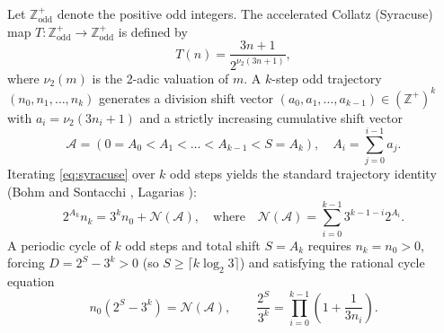 \documentclass[11pt, a4paper]{amsart}
\theoremstyle{definition}
\newcommand{\Z}{\mathbb{Z}}
\newcommand{\N}{\mathcal{N}}
\newcommand{\A}{\mathcal{A}}
\begin{document}
Let $\Z_{\text{odd}}^+$ denote the positive odd integers. The accelerated Collatz (Syracuse) map $T: \Z_{\text{odd}}^+ \to \Z_{\text{odd}}^+$ is defined by
\begin{equation}\label{eq:syracuse}
T(n) = \frac{3n + 1}{2^{\nu_2(3n+1)}},
\end{equation}
where $\nu_2(m)$ is the 2-adic valuation of $m$. A $k$-step odd trajectory $(n_0, n_1, \dots, n_k)$ generates a division shift vector $(a_0, a_1, \dots, a_{k-1}) \in (\Z^+)^k$ with $a_i = \nu_2(3n_i + 1)$ and a strictly increasing cumulative shift vector
\begin{equation}
\A = (0 = A_0 < A_1 < \dots < A_{k-1} < S = A_k), \quad A_i = \sum_{j=0}^{i-1} a_j.
\end{equation}
Iterating \eqref{eq:syracuse} over $k$ odd steps yields the standard trajectory identity (Bohm and Sontacchi \cite{Bohm1978}, Lagarias \cite{Lagarias1985}):
\begin{equation}\label{eq:traj_id}
2^{A_k} n_k = 3^k n_0 + \N(\A), \quad \text{where} \quad \N(\A) = \sum_{i=0}^{k-1} 3^{k-1-i} 2^{A_i}.
\end{equation}
A periodic cycle of $k$ odd steps and total shift $S = A_k$ requires $n_k = n_0 > 0$, forcing $D = 2^S - 3^k > 0$ (so $S \ge \lceil k \log_2 3 \rceil$) and satisfying the rational cycle equation
\begin{equation}\label{eq:cycle_eq}
n_0 (2^S - 3^k) = \N(\A), \qquad \frac{2^S}{3^k} = \prod_{i=0}^{k-1} \left(1 + \frac{1}{3n_i}\right).
\end{equation}
\end{document}
